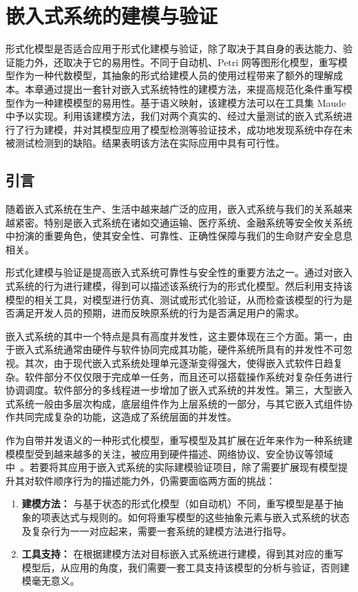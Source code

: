 \chapter{嵌入式系统的建模与验证}
\label{cha:modeling}

形式化模型是否适合应用于形式化建模与验证，除了取决于其自身的表达能力、验证能力外，还取决于它的易用性。不同于自动机、Petri 网等图形化模型，重写模型作为一种代数模型，其抽象的形式给建模人员的使用过程带来了额外的理解成本。本章通过提出一套针对嵌入式系统特性的建模方法，来提高规范化条件重写模型作为一种建模模型的易用性。基于语义映射，该建模方法可以在工具集 Maude 中予以实现。利用该建模方法，我们对两个真实的、经过大量测试的嵌入式系统进行了行为建模，并对其模型应用了模型检测等验证技术，成功地发现系统中存在未被测试检测到的缺陷。结果表明该方法在实际应用中具有可行性。

\section{引言}

随着嵌入式系统在生产、生活中越来越广泛的应用，嵌入式系统与我们的关系越来越紧密。特别是嵌入式系统在诸如交通运输、医疗系统、金融系统等安全攸关系统中扮演的重要角色，使其安全性、可靠性、正确性保障与我们的生命财产安全息息相关。

形式化建模与验证是提高嵌入式系统可靠性与安全性的重要方法之一。通过对嵌入式系统的行为进行建模，得到可以描述该系统行为的形式化模型。然后利用支持该模型的相关工具，对模型进行仿真、测试或形式化验证，从而检查该模型的行为是否满足开发人员的预期，进而反映原系统的行为是否满足用户的需求。

嵌入式系统的其中一个特点是具有高度并发性，这主要体现在三个方面。第一，由于嵌入式系统通常由硬件与软件协同完成其功能，硬件系统所具有的并发性不可忽视。其次，由于现代嵌入式系统处理单元逐渐变得强大，使得嵌入式软件日趋复杂。软件部分不仅仅限于完成单一任务，而且还可以搭载操作系统对复杂任务进行协调调度。软件部分的多线程进一步增加了嵌入式系统的并发性。第三，大型嵌入式系统一般由多层次构成，底层组件作为上层系统的一部分，与其它嵌入式组件协作共同完成复杂的功能，这造成了系统层面的并发性。

作为自带并发语义的一种形式化模型，重写模型及其扩展在近年来作为一种系统建模模型受到越来越多的关注，被应用到硬件描述、网络协议、安全协议等领域中~\cite{DBLP:journals/jlp/Meseguer12,DBLP:journals/iandc/MeseguerR13}。若要将其应用于嵌入式系统的实际建模验证项目，除了需要扩展现有模型提升其对软件顺序行为的描述能力外，仍需要面临两方面的挑战：
\begin{enumerate}
\item \textbf{建模方法：} 与基于状态的形式化模型（如自动机）不同，重写模型是基于抽象的项表达式与规则的。如何将重写模型的这些抽象元素与嵌入式系统的状态及复杂行为一一对应起来，需要一套系统的建模方法进行指导。
\item \textbf{工具支持：} 在根据建模方法对目标嵌入式系统进行建模，得到其对应的重写模型后，从应用的角度，我们需要一套工具支持该模型的分析与验证，否则建模毫无意义。
\end{enumerate}

